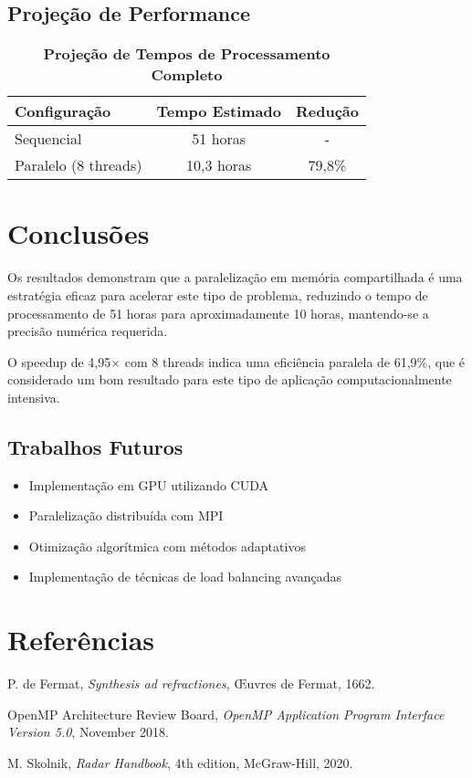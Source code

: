\documentclass[12pt,a4paper]{article}
\begin{document}
\subsection{Projeção de Performance}

\begin{table}[H]
\centering
\caption{\textcolor{warningorange}{\textbf{Projeção de Tempos de Processamento Completo}}}
\begin{tabular}{@{}lcc@{}}
\toprule
\textbf{Configuração} & \textbf{Tempo Estimado} & \textbf{Redução} \\
\midrule
Sequencial & 51 horas & - \\
Paralelo (8 threads) & 10{,}3 horas & 79{,}8\% \\
\bottomrule
\end{tabular}
\end{table}

\section{Conclusões}

Os resultados demonstram que a paralelização em memória compartilhada é uma estratégia eficaz para acelerar este tipo de problema, reduzindo o tempo de processamento de 51 horas para aproximadamente 10 horas, mantendo-se a precisão numérica requerida.

O speedup de 4,95× com 8 threads indica uma eficiência paralela de 61,9\%, que é considerado um bom resultado para este tipo de aplicação computacionalmente intensiva.

\subsection{Trabalhos Futuros}

\begin{itemize}
    \item Implementação em GPU utilizando CUDA
    \item Paralelização distribuída com MPI
    \item Otimização algorítmica com métodos adaptativos
    \item Implementação de técnicas de load balancing avançadas
\end{itemize}

\section{Referências}

\begin{thebibliography}{9}
P. de Fermat, \emph{Synthesis ad refractiones}, Œuvres de Fermat, 1662.

OpenMP Architecture Review Board, \emph{OpenMP Application Program Interface Version 5.0}, November 2018.

M. Skolnik, \emph{Radar Handbook}, 4th edition, McGraw-Hill, 2020.
\end{thebibliography}
\end{document}
